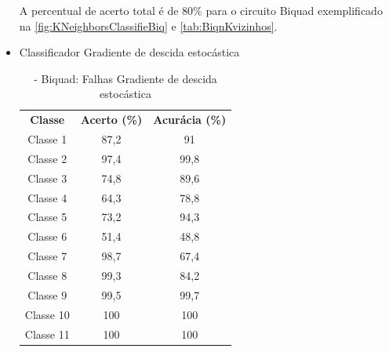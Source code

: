 \begin{itemize}
A percentual de acerto total é de 80\% para o circuito Biquad exemplificado na \ref{fig:KNeighborsClassifieBiq} e \ref{tab:BiqnKvizinhos}. 
\newpage

 \item Classificador Gradiente de descida estocástica
 
 \begin{table}[ht]
\centering
\begin{tabular}{ccc}
\textbf{Classe} & \textbf{Acerto (\%)} & \textbf{Acurácia (\%)} \\
Classe 1        & 87,2                  & 91                   \\
Classe 2        & 97,4                  & 99,8                   \\
Classe 3        & 74,8                  & 89,6                    \\
Classe 4        & 64,3                  & 78,8                    \\
Classe 5        & 73,2                  & 94,3                    \\
Classe 6        & 51,4                  & 48,8                    \\
Classe 7        & 98,7                  & 67,4                    \\
Classe 8        & 99,3                  & 84,2                    \\
Classe 9        & 99,5                  & 99,7                    \\
Classe 10       & 100                  & 100                    \\
Classe 11       & 100                  & 100                                   
\end{tabular}
\caption{\label{tab:BiqnGDE}- Biquad: Falhas Gradiente de descida estocástica}
\end{table}


\end{itemize}
